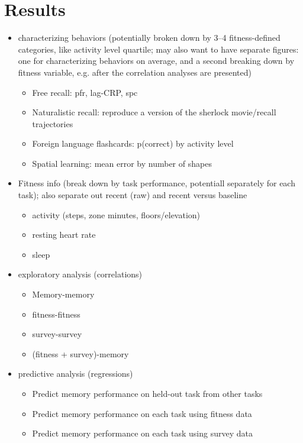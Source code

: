 \documentclass[10pt]{article}
\begin{document}
\section*{Results}
\begin{itemize}
\item characterizing behaviors (potentially broken down by 3--4
  fitness-defined categories, like activity level quartile; may also
  want to have separate figures: one for characterizing behaviors on
  average, and a second breaking down by fitness variable, e.g. after
  the correlation analyses are presented)
  \begin{itemize}
  \item Free recall: pfr, lag-CRP, spc
    \item Naturalistic recall: reproduce a version of the sherlock
      movie/recall trajectories
    \item Foreign language flashcards: p(correct) by activity level
      \item Spatial learning: mean error by number of shapes
      \end{itemize}
    \item Fitness info (break down by task performance, potentiall
      separately for each task); also separate out recent (raw) and recent versus baseline
      \begin{itemize}
      \item activity (steps, zone minutes, floors/elevation)
      \item resting heart rate
        \item sleep
        \end{itemize}
  \item exploratory analysis (correlations)
    \begin{itemize}
    \item Memory-memory
    \item fitness-fitness
    \item survey-survey
    \item (fitness + survey)-memory
    \end{itemize}
  \item predictive analysis (regressions)
    \begin{itemize}
    \item Predict memory performance on held-out task from other tasks
    \item Predict memory performance on each task using fitness data
      \item Predict memory performance on each task using survey data

\end{itemize}
\end{itemize}
\end{document}
